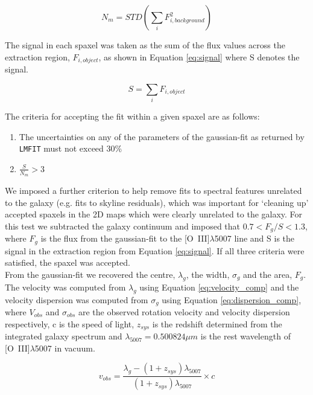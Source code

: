 \documentclass[fleqn,usenatbib]{mnras}
\begin{document}
\begin{equation}\label{eq:noise}
    N_{m} = STD\left(\sum_{i}F_{i,background}^{2}\right)
\end{equation}

\noindent
The signal in each spaxel was taken as the sum of the flux values across the extraction region, $F_{i,object}$, as shown in Equation \ref{eq:signal} where S denotes the signal.

\begin{equation}\label{eq:signal}
    S = \sum_{i}F_{i,object}
\end{equation}

\noindent
The criteria for accepting the fit within a given spaxel are as follows:

\begin{enumerate}[label=(\roman*),align=left]
\item The uncertainties on any of the parameters of the gaussian-fit as returned by {\tt LMFIT} must not exceed 30\%
\item $\frac{S}{N_{m}} > 3$
\end{enumerate}

\noindent
We imposed a further criterion to help remove fits to spectral features unrelated to the galaxy (e.g. fits to skyline residuals), which was important for `cleaning up' accepted spaxels in the 2D maps which were clearly unrelated to the galaxy. For this test we subtracted the galaxy continuum and imposed that $0.7 < F_{g}/{S} < 1.3$, where $F_{g}$ is the flux from the gaussian-fit to the [O~{\sc III}]$\lambda$5007 line and S is the signal in the extraction region from Equation \ref{eq:signal}. If all three criteria were satisfied, the spaxel was accepted. \\

\noindent
From the gaussian-fit we recovered the centre, $\lambda_{g}$, the width, $\sigma_{g}$ and the area, $F_{g}$.
The velocity was computed from $\lambda_{g}$ using Equation \ref{eq:velocity_comp} and the velocity dispersion was computed from $\sigma_{g}$ using Equation \ref{eq:dispersion_comp}, where $V_{obs}$ and $\sigma_{obs}$ are the observed rotation velocity and velocity dispersion respectively, c is the speed of light, $z_{sys}$ is the redshift determined from the integrated galaxy spectrum and $\lambda_{5007} = 0.500824\mu m$ is the rest wavelength of [O~{\sc III}]$\lambda$5007 in vacuum.

\begin{equation}\label{eq:velocity_comp}
   v_{obs} = \frac{\lambda_{g} - (1 + z_{sys})\lambda_{5007}}{(1 + z_{sys})\lambda_{5007}} \times c
\end{equation}
\end{document}
